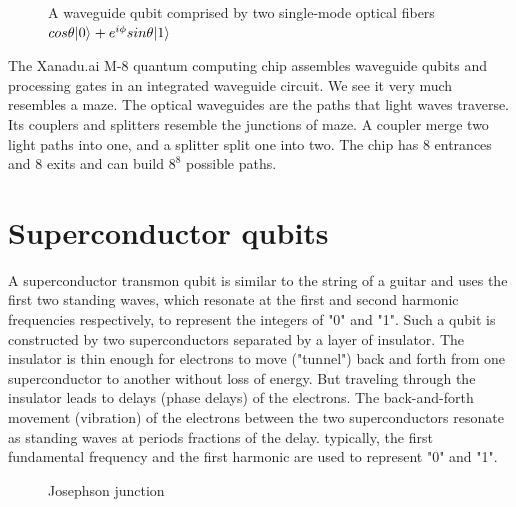 \documentclass{ctexbook}
\begin{document}
\begin{figure}[h]\label{Fiber}
\caption{A waveguide qubit comprised by two single-mode optical fibers $cos{\theta} \vert {0} \rangle_{} + e^{i \phi} sin{\theta} \vert {1} \rangle_{}$}
\end{figure}

The Xanadu.ai M-8 quantum computing chip assembles waveguide qubits and processing gates in an integrated waveguide circuit. We see it very much resembles a maze. The optical waveguides are the paths that light waves traverse. Its couplers and splitters resemble the junctions of maze. A coupler merge two light paths into one, and a splitter split one into two. The chip has 8 entrances and 8 exits and can build $8^8$ possible paths.

\section{Superconductor qubits}
A superconductor transmon qubit is similar to the string of a guitar and uses the first two standing waves, which resonate at the first and second harmonic frequencies respectively, to represent the integers of "0" and "1". Such a qubit is constructed by two superconductors separated by a layer of insulator. The insulator is thin enough for electrons to move ("tunnel") back and forth from one superconductor to another without loss of energy. But traveling through the insulator leads to delays (phase delays) of the electrons. The back-and-forth movement (vibration) of the electrons between the two superconductors resonate as standing waves at periods fractions of the delay. typically, the first fundamental frequency and the first harmonic are used to represent "0" and "1".
\begin{figure}[h]

\caption{Josephson junction}
\label{Superconductor}
\end{figure}
\end{document}
